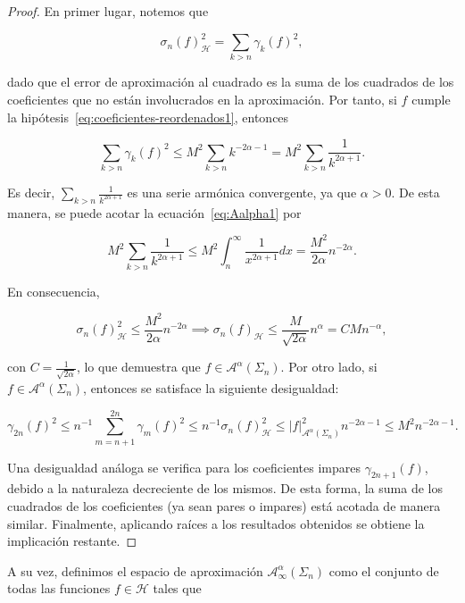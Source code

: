 \begin{proof}
    En primer lugar, notemos que

    \[
        \sigma_n(f)^2_{\mathcal{H}} = \sum_{k>n} \gamma_k(f)^2,
    \]

    dado que el error de aproximación al cuadrado es la suma de los cuadrados de los coeficientes que no están involucrados en la aproximación. Por tanto, si $f$ cumple la hipótesis~\eqref{eq:coeficientes-reordenados1}, entonces

    \begin{equation}\label{eq:Aalpha1}
        \sum_{k>n} \gamma_k(f)^2 \leq M^2 \sum_{k>n} k^{-2\alpha - 1} = M^2 \sum_{k>n} \frac{1}{k^{2\alpha + 1}}.
    \end{equation}

    Es decir, $\sum_{k>n} \frac{1}{k^{2\alpha + 1}}$ es una serie armónica convergente, ya que $\alpha > 0$. De esta manera, se puede acotar la ecuación~\eqref{eq:Aalpha1} por

    \[
        M^2 \sum_{k>n} \frac{1}{k^{2\alpha + 1}} \leq M^2 \int_{n}^{\infty} \frac{1}{x^{2\alpha + 1}}dx = \frac{M^2}{2\alpha}n^{-2\alpha}.
    \]

    En consecuencia,

    \[
        \sigma_n(f)^2_{\mathcal{H}} \leq \frac{M^2}{2\alpha}n^{-2\alpha} \implies \sigma_n(f)_{\mathcal{H}} \leq \frac{M}{\sqrt{2\alpha}}n^{\alpha} = C M n^{-\alpha},
    \]

    con $C = \frac{1}{\sqrt{2\alpha}}$, lo que demuestra que $f \in \mathcal{A}^{\alpha}(\Sigma_n)$. Por otro lado, si $f \in \mathcal{A}^{\alpha}(\Sigma_n)$, entonces se satisface la siguiente desigualdad:

    \[
        \gamma_{2n}(f)^2 \leq n^{-1} \sum_{m=n+1}^{2n} \gamma_m(f)^2 \leq n^{-1} \sigma_n(f)_{\mathcal{H}}^2 \leq |f|_{\mathcal{A}^{\alpha}(\Sigma_n)}^2 n^{-2\alpha - 1} \leq M^2 n^{-2\alpha - 1}.
    \]

    Una desigualdad análoga se verifica para los coeficientes impares $\gamma_{2n+1}(f)$, debido a la naturaleza decreciente de los mismos. De esta forma, la suma de los cuadrados de los coeficientes (ya sean pares o impares) está acotada de manera similar. Finalmente, aplicando raíces a los resultados obtenidos se obtiene la implicación restante.
\end{proof}

A su vez, definimos el espacio de aproximación $\mathcal{A}_{\infty}^{\alpha}(\Sigma_n)$ como el conjunto de todas las funciones $f \in \mathcal{H}$ tales que

